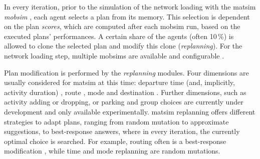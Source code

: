 In every iteration, prior to the simulation of the network loading with the \gls{matsim} \emph{\gls{mobsim}} \citep[e.g.,][]{Cetin_PhDThesis_2005}, each agent selects a plan from its memory. This selection is dependent on the plan \emph{scores}, which are computed after each mobsim run, based on the executed plans' performances. A certain share of the agents 
(often 10\,\%) is allowed to clone the selected plan and modify this clone (\emph{\gls{replanning}}).
For the network loading 
step, multiple \glspl{mobsim} are available and configurable \citep[][p.10f]{HorniEtAl_TechRep_IVT_2011_a, MATSim_Userguide_2015}. 

Plan modification is performed by the \emph{replanning} modules. Four dimensions are usually considered for \gls{matsim} at this time: departure time (and, implicitly, activity duration) \citep[][]{BalmerRaneyEtAl2005act-times}, route \citep[]{LefebvreBalmer_unpub_STRC_2007}, mode \citep{GretherEtAl2009SimpleModeChoiceIPL} and destination \citep{HorniEtAl_TRR_2009,HorniEtAl_unpub_TRB_2012}. Further dimensions, such as activity adding or dropping, or parking and group choices are currently under development and only available experimentally. %
\gls{matsim} replanning offers different strategies to adapt plans, ranging from random mutation to approximate suggestions, to best-response answers, where in every iteration, the currently optimal choice is searched. For example, routing
often is a best-response modification%
, while time and mode replanning are random mutations.

